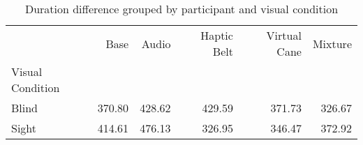 
\begin{table}[!htb]
\centering
\caption{Duration difference grouped by participant and visual condition}
\label{tab:duracao_average_group}
\begin{tabular}{lrrrrr}
\toprule
{} &    Base &   Audio & Haptic Belt & Virtual Cane & Mixture \\
Visual Condition &         &         &             &              &         \\
\midrule
Blind            &  370.80 &  428.62 &      429.59 &       371.73 &  326.67 \\
Sight            &  414.61 &  476.13 &      326.95 &       346.47 &  372.92 \\
\bottomrule
\end{tabular}
\end{table}

